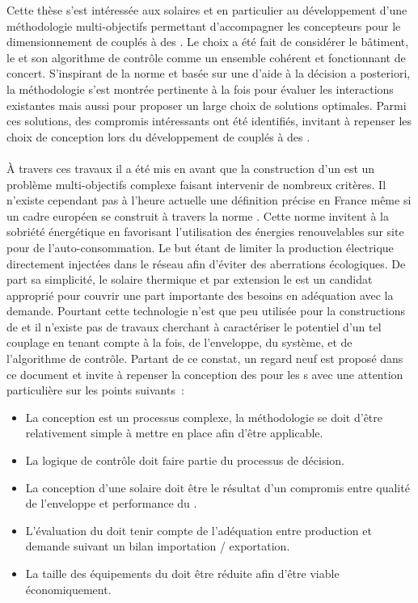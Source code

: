 
Cette thèse s’est intéressée aux  solaires et en particulier au développement
d’une méthodologie  multi-objectifs permettant d’accompagner les concepteurs pour le
dimensionnement de  couplés à des . Le choix a été fait de
considérer le bâtiment, le  et son algorithme de contrôle comme un ensemble
cohérent et fonctionnant de concert. S’inspirant de la norme  et
basée sur une d’aide à la décision a posteriori, la méthodologie s’est montrée pertinente
à la fois pour évaluer les interactions existantes mais aussi pour proposer un large choix
de solutions optimales. Parmi ces solutions, des compromis intéressants ont été
identifiés, invitant à repenser les choix de conception lors du développement de 
couplés à des .


\paragraph{} %
À travers ces travaux il a été mis en avant que la construction d’un  est un
problème multi-objectifs complexe faisant intervenir de nombreux critères. Il n’existe
cependant pas à l’heure actuelle une définition précise en France même si un cadre
européen se construit à travers la norme . Cette norme invitent à
la sobriété énergétique en favorisant l’utilisation des énergies renouvelables sur site
pour de l’auto-consommation. Le but étant de limiter la production électrique directement
injectées dans le réseau afin d’éviter des aberrations écologiques.
De part sa simplicité, le solaire thermique et par extension le  est un
candidat approprié pour couvrir une part importante des besoins en adéquation avec la
demande. Pourtant cette technologie n’est que peu utilisée pour la constructions de
 et il n’existe pas de travaux cherchant à caractériser le potentiel d’un tel
couplage en tenant compte à la fois, de l’enveloppe, du système, et de l’algorithme de
contrôle. Partant de ce constat, un regard neuf est proposé dans ce document et invite à
repenser la conception des  pour les s avec une attention
particulière sur les points suivants~:
\begin{itemize}
    \item La conception est un processus complexe, la méthodologie se doit d’être
          relativement simple à mettre en place afin d’être applicable.
    \item La logique de contrôle doit faire partie du processus de décision.
    \item La conception d’une  solaire doit être le résultat d’un compromis
          entre qualité de l’enveloppe et performance du .
    \item L’évaluation du  doit tenir compte de l’adéquation entre production
          et demande suivant un bilan importation / exportation.
    \item La taille des équipements du  doit être réduite afin d’être viable
          économiquement.
\end{itemize}

